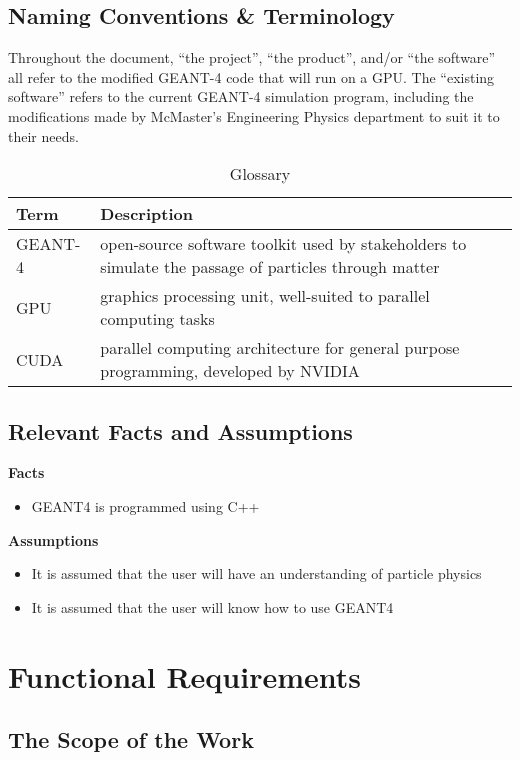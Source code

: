 \documentclass[12pt]{article}
\begin{document}
\subsection{Naming Conventions \& Terminology} %
Throughout the document, ``the project'', ``the product'', and/or ``the software'' all refer to the modified GEANT-4 code that will run on a GPU. The ``existing software'' refers to the current GEANT-4 simulation program, including the modifications made by McMaster's Engineering Physics department to suit it to their needs.\\
\begin{table}[h]
\centering
\begin{tabularx}{\textwidth}{|l|X|}
\hline
Term & Description\\
\hline
GEANT-4 & open-source software toolkit used by stakeholders to simulate the passage of particles through matter\\
GPU & graphics processing unit, well-suited to parallel computing tasks\\
CUDA & parallel computing architecture for general purpose programming, developed by NVIDIA\\
\hline
\end{tabularx}
\caption{Glossary}
\end{table}
\subsection{Relevant Facts and Assumptions} %
\textbf{Facts}
\begin{itemize}
\item GEANT4 is programmed using C++
\end{itemize}
\textbf{Assumptions}
\begin{itemize}
\item It is assumed that the user will have an understanding of particle physics
\item It is assumed that the user will know how to use GEANT4
\end{itemize}
\section{Functional Requirements}
\subsection{The Scope of the Work} %
\end{document}
